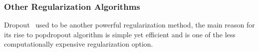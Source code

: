 \subsubsection{Other Regularization Algorithms}

Dropout~\cite{JMLR:v15:srivastava14a} used to be another powerful regularization method, the main reason for its rise to popdropout algorithm is simple yet efficient and is one of the less computationally expensive regularization option. 